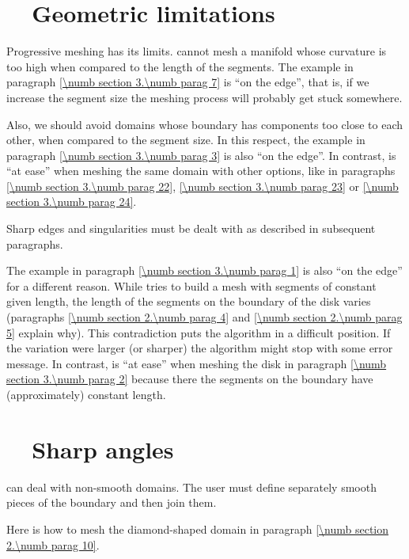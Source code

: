 \section{~~Geometric limitations}\label{\numb section 3.\numb parag 16}

Progressive meshing has its limits.
{\ManiFEM} cannot mesh a manifold whose curvature is too high when compared to the
length of the segments.
The example in paragraph \ref{\numb section 3.\numb parag 7} is ``on the edge'', that is,
if we increase the segment size the meshing process will probably get stuck somewhere.

Also, we should avoid domains whose boundary has components too close to each other,
when compared to the segment size.
In this respect, the example in paragraph \ref{\numb section 3.\numb parag 3} is also
``on the edge''.
In contrast, {\maniFEM} is ``at ease'' when meshing the same domain with other options,
like in paragraphs \ref{\numb section 3.\numb parag 22}, \ref{\numb section 3.\numb parag 23}
or \ref{\numb section 3.\numb parag 24}.

Sharp edges and singularities must be dealt with as described in subsequent paragraphs.

The example in paragraph \ref{\numb section 3.\numb parag 1} is also ``on the edge''
for a different reason.
While {\maniFEM} tries to build a mesh with segments of constant given length,
the length of the segments on the boundary of the disk varies (paragraphs
\ref{\numb section 2.\numb parag 4} and \ref{\numb section 2.\numb parag 5} explain why).
This contradiction puts the algorithm in a difficult position.
If the variation were larger (or sharper) the algorithm might stop with some error message.
In contrast, {\maniFEM} is ``at ease'' when meshing the disk in paragraph
\ref{\numb section 3.\numb parag 2} because there the segments on the boundary have
(approximately) constant length.


\section{~~Sharp angles}\label{\numb section 3.\numb parag 17}

{\ManiFEM} can deal with non-smooth domains.
The user must define separately smooth pieces of the boundary and then join them.

Here is how to mesh the diamond-shaped domain in paragraph \ref{\numb section 2.\numb parag 10}.

